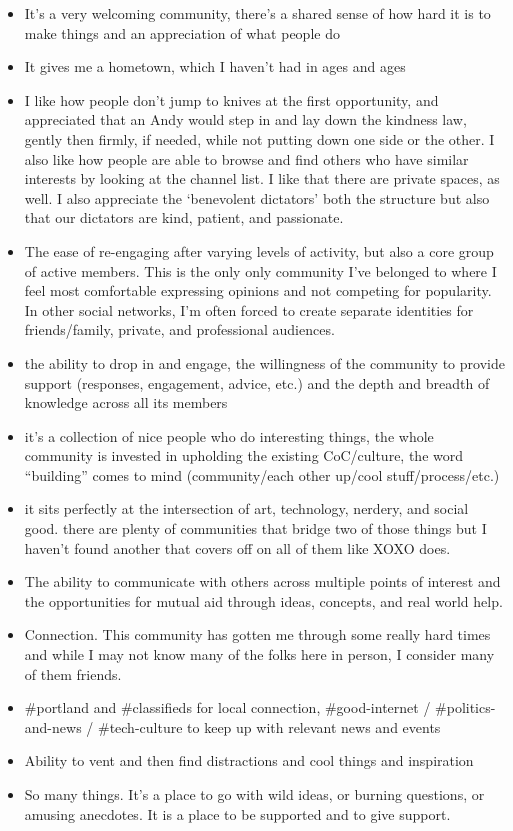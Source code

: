 \documentclass[
]{book}
\providecommand{\tightlist}{%
  \setlength{\itemsep}{0pt}\setlength{\parskip}{0pt}}
\begin{document}
\begin{itemize}
\tightlist
\item
  It's a very welcoming community, there's a shared sense of how hard it is to make things and an appreciation of what people do
\item
  It gives me a hometown, which I haven't had in ages and ages
\item
  I like how people don't jump to knives at the first opportunity, and appreciated that an Andy would step in and lay down the kindness law, gently then firmly, if needed, while not putting down one side or the other. I also like how people are able to browse and find others who have similar interests by looking at the channel list. I like that there are private spaces, as well. I also appreciate the `benevolent dictators' both the structure but also that our dictators are kind, patient, and passionate.
\item
  The ease of re-engaging after varying levels of activity, but also a core group of active members. This is the only only community I've belonged to where I feel most comfortable expressing opinions and not competing for popularity. In other social networks, I'm often forced to create separate identities for friends/family, private, and professional audiences.
\item
  the ability to drop in and engage, the willingness of the community to provide support (responses, engagement, advice, etc.) and the depth and breadth of knowledge across all its members
\item
  it's a collection of nice people who do interesting things, the whole community is invested in upholding the existing CoC/culture, the word ``building'' comes to mind (community/each other up/cool stuff/process/etc.)
\item
  it sits perfectly at the intersection of art, technology, nerdery, and social good. there are plenty of communities that bridge two of those things but I haven't found another that covers off on all of them like XOXO does.
\item
  The ability to communicate with others across multiple points of interest and the opportunities for mutual aid through ideas, concepts, and real world help.
\item
  Connection. This community has gotten me through some really hard times and while I may not know many of the folks here in person, I consider many of them friends.
\item
  \#portland and \#classifieds for local connection, \#good-internet / \#politics-and-news / \#tech-culture to keep up with relevant news and events
\item
  Ability to vent and then find distractions and cool things and inspiration
\item
  So many things. It's a place to go with wild ideas, or burning questions, or amusing anecdotes. It is a place to be supported and to give support.
\end{itemize}
\end{document}
